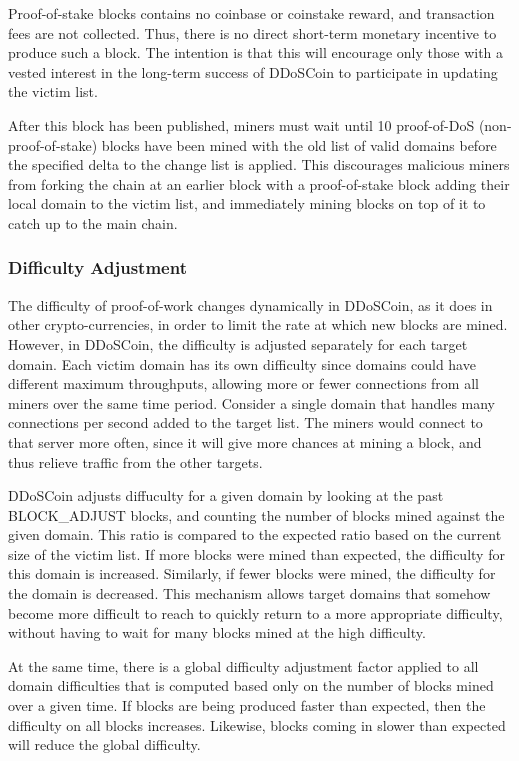 Proof-of-stake blocks contains no coinbase or coinstake reward, and transaction
fees are not collected. Thus, there is no direct short-term monetary incentive
to produce such a block. The intention is that this will encourage only those
with a vested interest in the long-term success of DDoSCoin to participate in
updating the victim list.

After this block has been published, miners must wait until 10 proof-of-DoS
(non-proof-of-stake) blocks have been mined with the old list of valid domains
before the specified delta to the change list is applied. This discourages
malicious miners from forking the chain at an earlier block with a
proof-of-stake block adding their local domain to the victim list, and
immediately mining blocks on top of it to catch up to the main chain.


\subsubsection{Difficulty Adjustment}

The difficulty of proof-of-work changes dynamically in DDoSCoin, as it does in
other crypto-currencies, in order to limit the rate at which new blocks are mined.
However, in DDoSCoin, the difficulty is adjusted separately for each target domain. 
Each victim domain has its own difficulty since domains could have different maximum throughputs, 
allowing more or fewer connections from all miners over the same time period. Consider
a single domain that handles many connections per second added to the target list. 
The miners would connect to that server more often, since it will give more chances 
at mining a block, and thus relieve traffic from the other targets.

DDoSCoin adjusts diffuculty for a given domain by looking at the past
BLOCK\_ADJUST blocks, and counting the number of blocks mined against
the given domain. This ratio is compared to the expected ratio based on the
current size of the victim list. If more blocks were mined than expected, the
difficulty for this domain is increased. Similarly, if fewer blocks were mined,
the difficulty for the domain is decreased.
This mechanism allows target domains that somehow become more
difficult to reach to quickly return to a more appropriate difficulty, without
having to wait for many blocks mined at the high difficulty. 

At the same time, there is a global difficulty adjustment factor applied to all
domain difficulties that is computed based only on the number of blocks mined
over a given time. If blocks are being produced faster than expected, then the
difficulty on all blocks increases. Likewise, blocks coming in slower than
expected will reduce the global difficulty.


